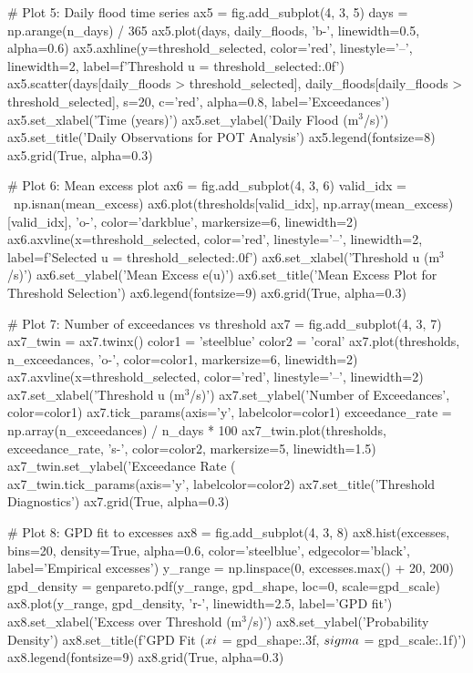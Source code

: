 \documentclass[a4paper, 11pt]{article}
\begin{document}
\begin{pycode}
# Plot 5: Daily flood time series
ax5 = fig.add_subplot(4, 3, 5)
days = np.arange(n_days) / 365
ax5.plot(days, daily_floods, 'b-', linewidth=0.5, alpha=0.6)
ax5.axhline(y=threshold_selected, color='red', linestyle='--', linewidth=2,
           label=f'Threshold u = {threshold_selected:.0f}')
ax5.scatter(days[daily_floods > threshold_selected],
           daily_floods[daily_floods > threshold_selected],
           s=20, c='red', alpha=0.8, label='Exceedances')
ax5.set_xlabel('Time (years)')
ax5.set_ylabel('Daily Flood (m$^3$/s)')
ax5.set_title('Daily Observations for POT Analysis')
ax5.legend(fontsize=8)
ax5.grid(True, alpha=0.3)

# Plot 6: Mean excess plot
ax6 = fig.add_subplot(4, 3, 6)
valid_idx = ~np.isnan(mean_excess)
ax6.plot(thresholds[valid_idx], np.array(mean_excess)[valid_idx], 'o-',
        color='darkblue', markersize=6, linewidth=2)
ax6.axvline(x=threshold_selected, color='red', linestyle='--', linewidth=2,
           label=f'Selected u = {threshold_selected:.0f}')
ax6.set_xlabel('Threshold u (m$^3$/s)')
ax6.set_ylabel('Mean Excess e(u)')
ax6.set_title('Mean Excess Plot for Threshold Selection')
ax6.legend(fontsize=9)
ax6.grid(True, alpha=0.3)

# Plot 7: Number of exceedances vs threshold
ax7 = fig.add_subplot(4, 3, 7)
ax7_twin = ax7.twinx()
color1 = 'steelblue'
color2 = 'coral'
ax7.plot(thresholds, n_exceedances, 'o-', color=color1, markersize=6, linewidth=2)
ax7.axvline(x=threshold_selected, color='red', linestyle='--', linewidth=2)
ax7.set_xlabel('Threshold u (m$^3$/s)')
ax7.set_ylabel('Number of Exceedances', color=color1)
ax7.tick_params(axis='y', labelcolor=color1)
exceedance_rate = np.array(n_exceedances) / n_days * 100
ax7_twin.plot(thresholds, exceedance_rate, 's-', color=color2, markersize=5, linewidth=1.5)
ax7_twin.set_ylabel('Exceedance Rate (\\%
ax7_twin.tick_params(axis='y', labelcolor=color2)
ax7.set_title('Threshold Diagnostics')
ax7.grid(True, alpha=0.3)

# Plot 8: GPD fit to excesses
ax8 = fig.add_subplot(4, 3, 8)
ax8.hist(excesses, bins=20, density=True, alpha=0.6, color='steelblue',
        edgecolor='black', label='Empirical excesses')
y_range = np.linspace(0, excesses.max() + 20, 200)
gpd_density = genpareto.pdf(y_range, gpd_shape, loc=0, scale=gpd_scale)
ax8.plot(y_range, gpd_density, 'r-', linewidth=2.5, label='GPD fit')
ax8.set_xlabel('Excess over Threshold (m$^3$/s)')
ax8.set_ylabel('Probability Density')
ax8.set_title(f'GPD Fit ($\\xi$ = {gpd_shape:.3f}, $\\sigma$ = {gpd_scale:.1f})')
ax8.legend(fontsize=9)
ax8.grid(True, alpha=0.3)


\end{pycode}
\end{document}
